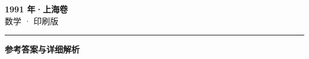 \documentclass[zihao=5, a4paper]{ctexart}
\begin{document}
\begin{center}
  {\Large\bfseries 1991 年·上海卷}\\[4pt]
  {\large 数学 · 印刷版}
\end{center}
\medskip
{}

\par\bigskip\hrule\bigskip
{}
\begin{center}{\large\bfseries 参考答案与详细解析}\end{center}
\smallskip

\end{document}

